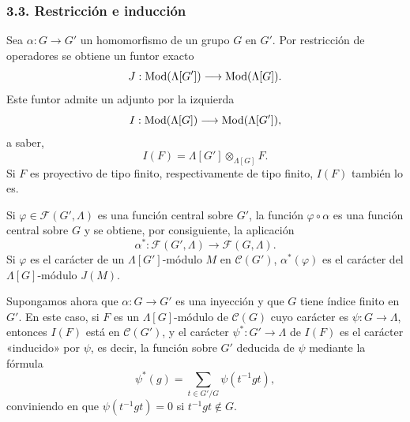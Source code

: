 \subsubsection*{3.3. Restricción e inducción}

Sea $\alpha:G\to G'$ un homomorfismo de un grupo $G$ en $G'$. Por restricción de operadores se obtiene un funtor exacto
\[
J:\operatorname{Mod}(\Lambda[G'])\longrightarrow\operatorname{Mod}(\Lambda[G]).
\]
Este funtor admite un adjunto por la izquierda
\[
I:\operatorname{Mod}(\Lambda[G])\longrightarrow\operatorname{Mod}(\Lambda[G']),
\]
a saber,
\[
I(F)=\Lambda[G']\otimes_{\Lambda[G]}F.
\]
Si $F$ es proyectivo de tipo finito, respectivamente de tipo finito, $I(F)$ también lo es.

Si $\varphi\in\mathcal F(G',\Lambda)$ es una función central sobre $G'$, la función $\varphi\circ\alpha$ es una función central sobre $G$ y se obtiene, por consiguiente, la aplicación
\[
\alpha^*: \mathcal F(G',\Lambda)\longrightarrow\mathcal F(G,\Lambda).
\]
Si $\varphi$ es el carácter de un $\Lambda[G']$-módulo $M$ en $\mathcal C(G')$, $\alpha^*(\varphi)$ es el carácter del $\Lambda[G]$-módulo $J(M)$.

Supongamos ahora que $\alpha:G\to G'$ es una inyección y que $G$ tiene índice finito en $G'$. En este caso, si $F$ es un $\Lambda[G]$-módulo de $\mathcal C(G)$ cuyo carácter es $\psi:G\to\Lambda$, entonces $I(F)$ está en $\mathcal C(G')$, y el carácter $\psi^*:G'\to\Lambda$ de $I(F)$ es el carácter «inducido» por $\psi$, es decir, la función sobre $G'$ deducida de $\psi$ mediante la fórmula
\[
\psi^*(g)=\sum_{t\in G'/G}\psi(t^{-1}gt),
\tag{3.3.1}
\]
conviniendo en que $\psi(t^{-1}gt)=0$ si $t^{-1}gt\notin G$.
